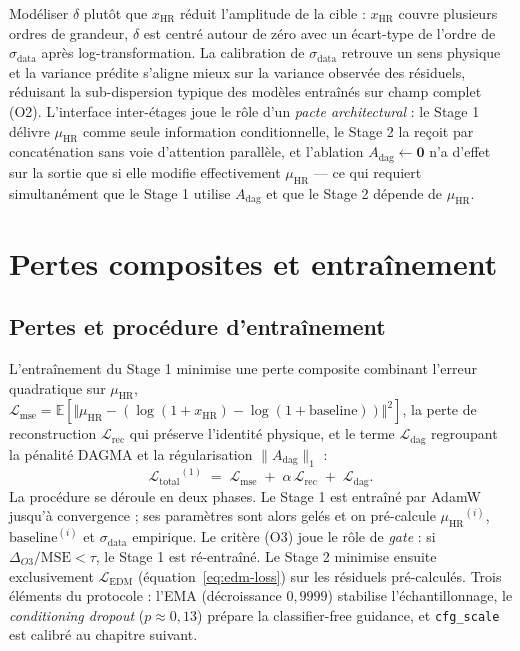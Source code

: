 \documentclass[14pt,a4paper,openany]{extreport}
\theoremstyle{definition}
\newcommand{\HR}{\ensuremath{\text{HR}}}
\newcommand{\xHR}{\ensuremath{x_{\HR}}}
\newcommand{\muHR}{\ensuremath{\mu_{\HR}}}
\newcommand{\Adag}{\ensuremath{A_{\mathrm{dag}}}}
\newcommand{\Lmse}{\ensuremath{\mathcal{L}_{\mathrm{mse}}}}
\newcommand{\Lrec}{\ensuremath{\mathcal{L}_{\mathrm{rec}}}}
\newcommand{\LEDM}{\ensuremath{\mathcal{L}_{\mathrm{EDM}}}}
\newcommand{\Ltotal}{\ensuremath{\mathcal{L}_{\mathrm{total}}}}
\begin{document}
Modéliser $\delta$ plutôt que $\xHR$ réduit l'amplitude de la cible : $\xHR$ couvre plusieurs ordres de grandeur, $\delta$ est centré autour de zéro avec un écart-type de l'ordre de $\sigma_{\mathrm{data}}$ après log-transformation. La calibration de $\sigma_{\mathrm{data}}$ retrouve un sens physique et la variance prédite s'aligne mieux sur la variance observée des résiduels, réduisant la sub-dispersion typique des modèles entraînés sur champ complet (O2). L'interface inter-étages joue le rôle d'un \emph{pacte architectural} : le Stage 1 délivre $\muHR$ comme seule information conditionnelle, le Stage 2 la reçoit par concaténation sans voie d'attention parallèle, et l'ablation $\Adag \leftarrow \mathbf{0}$ n'a d'effet sur la sortie que si elle modifie effectivement $\muHR$ --- ce qui requiert simultanément que le Stage 1 utilise $\Adag$ et que le Stage 2 dépende de $\muHR$.

\section{Pertes composites et entraînement}
\label{sec:oracle-pertes}

\subsection{Pertes et procédure d'entraînement}
\label{ssec:oracle-pertes-stage1}

L'entraînement du Stage 1 minimise une perte composite combinant l'erreur quadratique sur $\muHR$, $\Lmse = \mathbb{E}[\Vert \muHR - (\log(1+\xHR) - \log(1+\mathrm{baseline}))\Vert^2]$, la perte de reconstruction $\Lrec$ qui préserve l'identité physique, et le terme $\mathcal{L}_{\mathrm{dag}}$ regroupant la pénalité DAGMA et la régularisation $\|\Adag\|_1$ :
\begin{equation}
  \Ltotal^{(1)} \;=\; \Lmse \;+\; \alpha\, \Lrec \;+\; \mathcal{L}_{\mathrm{dag}}.
  \label{eq:loss-total-stage1}
\end{equation}
La procédure se déroule en deux phases. Le Stage 1 est entraîné par AdamW jusqu'à convergence ; ses paramètres sont alors gelés et on pré-calcule $\muHR^{(i)}$, $\mathrm{baseline}^{(i)}$ et $\sigma_{\mathrm{data}}$ empirique. Le critère (O3) joue le rôle de \emph{gate} : si $\Delta_{O3}/\mathrm{MSE} < \tau$, le Stage 1 est ré-entraîné. Le Stage 2 minimise ensuite exclusivement $\LEDM$ (équation~\ref{eq:edm-loss}) sur les résiduels pré-calculés. Trois éléments du protocole : l'EMA (décroissance $0{,}9999$) stabilise l'échantillonnage, le \emph{conditioning dropout} ($p \approx 0{,}13$) prépare la classifier-free guidance, et \texttt{cfg\_scale} est calibré au chapitre suivant.
\end{document}
